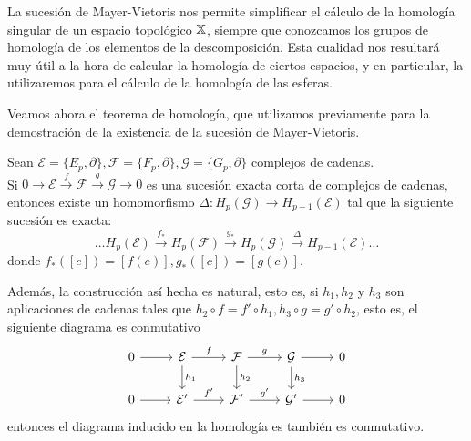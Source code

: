La sucesión de Mayer-Vietoris nos permite simplificar el cálculo de la homología singular de un espacio topológico ${\mathbb X}$, siempre
que conozcamos los grupos de homología de los elementos de la descomposición. Esta cualidad nos resultará muy útil a la hora de
calcular la homología de ciertos espacios, y en particular, la utilizaremos para el cálculo de la homología de las esferas.

Veamos ahora el teorema de homología, que utilizamos previamente para la demostración de la existencia de la sucesión de Mayer-Vietoris.

\begin{theorem}
  Sean $\mathcal{E} = \{E_p, \partial\}, \mathcal{F} = \{F_p, \partial\}, \mathcal{G} = \{G_p, \partial\}$ complejos de cadenas. \\
  Si $0 \to \mathcal{E} \xrightarrow{f} \mathcal{F} \xrightarrow{g} \mathcal{G} \to 0$ es una sucesión exacta corta de complejos
  de cadenas, entonces existe un homomorfismo $\Delta \colon H_p(\mathcal{G}) \to H_{p-1}(\mathcal{E})$ tal que la siguiente
  sucesión es exacta:
  \[ \dots H_p(\mathcal{E}) \xrightarrow{f_*} H_p(\mathcal{F}) \xrightarrow{g_*} H_p(\mathcal{G}) \xrightarrow{\Delta} H_{p-1}(\mathcal{E}) \dots \]
  donde $f_*([e]) = [f(e)], g_*([c]) = [g(c)]$.

  Además, la construcción así hecha es natural, esto es, si $h_1, h_2$ y $h_3$ son aplicaciones de cadenas tales que
  $h_2 \circ f = f' \circ h_1, h_3 \circ g = g' \circ h_2$, esto es, el siguiente diagrama es conmutativo
  \[ \begin{tikzcd}
    0 \arrow{r} & \mathcal{E} \arrow{r}{f} \arrow{d}{h_1} & \mathcal{F} \arrow{r}{g} \arrow{d}{h_2} & \mathcal{G} \arrow{r} \arrow{d}{h_3} & 0 \\
    0 \arrow{r} & \mathcal{E'} \arrow{r}{f'} & \mathcal{F'} \arrow{r}{g'} & \mathcal{G'} \arrow{r} & 0
  \end{tikzcd} \]
  entonces el diagrama inducido en la homología es también es conmutativo.
\end{theorem}

